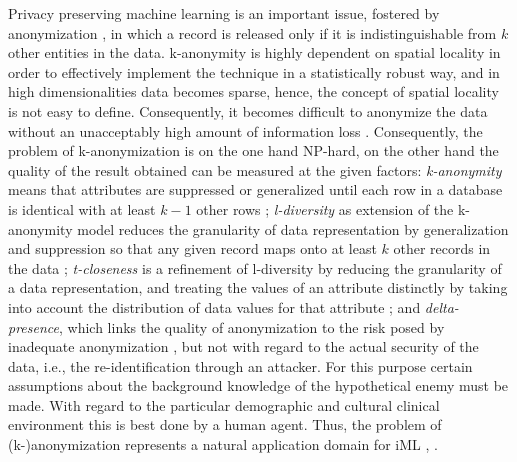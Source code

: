 \documentclass{llncs}
\begin{document}
Privacy preserving machine learning is an important issue, fostered by anonymization \cite{Samarati:2001:kAnonymity}, in which a record is released only if it is indistinguishable from $k$ other entities in the data. k-anonymity is highly dependent on spatial locality in order to effectively implement the technique in a statistically robust way, and in high dimensionalities data becomes sparse, hence, the concept of spatial locality is not easy to define. Consequently, it becomes difficult to anonymize the data without an unacceptably high amount of information loss \cite{Aggarwal:2005:kAnonymity}. Consequently, the problem of k-anonymization is on the one hand NP-hard, on the other hand the quality of the result obtained can be measured at the given factors: \emph{k-anonymity} means that attributes are suppressed or generalized until each row in a database is identical with at least $k-1$ other rows   \cite{Sweeney:2002:k-Anonymity}; \emph{l-diversity} as extension of the k-anonymity model reduces the granularity of data representation by generalization and suppression so that any given record maps onto at least $k$ other records in the data \cite{MachanavajjhalaEtAl:2007:l-Diversity}; \emph{t-closeness} is a refinement of l-diversity by reducing the granularity of a data representation, and treating the values of an attribute distinctly by taking into account the distribution of data values for that attribute \cite{LiEtAl:2007:t-closeness}; and \emph{delta-presence}, which links the quality of anonymization to the risk posed by inadequate anonymization \cite{NergizClifton:2010:Delta-Presence}, but not with regard to the actual security of the data, i.e., the re-identification through an attacker. For this purpose certain assumptions about the background knowledge of the hypothetical enemy must be made. With regard to the particular demographic and cultural clinical environment this is best done by a human agent. Thus, the problem of (k-)anonymization represents a natural application domain for iML \cite{Holzinger:2016:iML}, \cite{Kieseberg:2016:Doctor-in-the-Loop}.

\begin {comment}
\section{Glossary and Key Terms}
NOTE: this section may not to be used for a conference
\textbf{Note: This is only for use when producing a Springer LNCS SOTA State-of-the-Art-Analysis paper}
\\[0,2cm]
\emph{SaNGreeA} is the abbreviation for Social Network Greedy Anonymization, which describes an anonymization algorithm which takes into account information loss as well as structural loss (from anonymizing the neighborhood of a network node). It is said to be greedy as it uses greedy clustering under the hood in order to avoid having to sift through an exponential solution space to find an optimum.

\end{comment}
\end{document}
